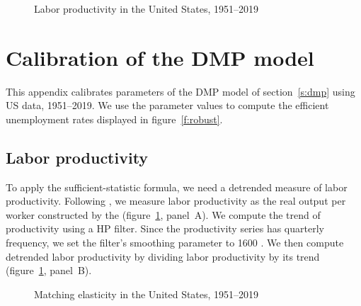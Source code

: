 \documentclass[letterpaper,12pt,leqno]{article}
\def\pdf{../../figures/xhosios_202103.pdf}
\begin{document}
\begin{figure}[t]
\hfill
{}
\caption{Labor productivity in the United States, 1951--2019}
\label{f:p}\end{figure}

\section{Calibration of the DMP model}\label{a:dmp}

This appendix calibrates parameters of the DMP model of section~\ref{s:dmp} using US data, 1951--2019. We use the parameter values to compute the efficient unemployment rates displayed in figure~\ref{f:robust}.

\subsection{Labor productivity}

To apply the sufficient-statistic formula, we need a detrended measure of labor productivity. Following , we measure labor productivity as the real output per worker constructed by the  (figure~\ref{f:p}, panel~A).  We compute the trend of productivity using a HP filter. Since the productivity series has quarterly frequency, we set the filter's smoothing parameter to 1600 . We then compute detrended labor productivity by dividing labor productivity by its trend (figure~\ref{f:p}, panel~B).

\begin{figure}[t]
\hfill
{}
\caption{Matching elasticity in the United States, 1951--2019}
\label{f:alpha}\end{figure}
\end{document}
